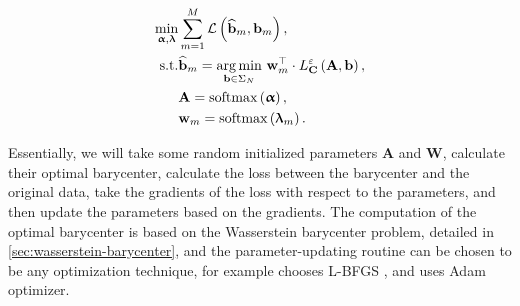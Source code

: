 \begin{equation}\label{eqn:wasserstein-dictionary-problem-unconstrained}
  \begin{aligned}
    \min_{\boldsymbol\upalpha, \boldsymbol\uplambda}
     &
    \sum_{m = 1}^M \mathcal{L} \left(\widehat{\mathbf{b}}_m, \mathbf{b}_m\right),             \\
    \text{s.t.}
     & \widehat{\mathbf{b}}_m =
    \operatorname*{arg\,min}_{\mathbf{b} \in \Sigma_N}\,
    \mathbf{w}_{m}^\top \cdot L_{\mathbf{C}}^\varepsilon \left(\mathbf{A}, \mathbf{b}\right), \\
     & \mathbf{A} = \text{softmax} \left(\boldsymbol\upalpha\right),                          \\
     & \mathbf{w}_m = \text{softmax} \left(\boldsymbol\uplambda_m\right).
  \end{aligned}
\end{equation}


Essentially, we will take some random initialized parameters $\mathbf{A}$ and $\mathbf{W}$,
calculate their optimal barycenter,
calculate the loss between the barycenter and the original data,
take the gradients of the loss with respect to the parameters,
and then update the parameters based on the gradients.
The computation of the optimal barycenter is based on the Wasserstein barycenter problem,
detailed in \cref{sec:wasserstein-barycenter},
and the parameter-updating routine can be chosen to be any optimization technique,
for example \citet{schmitz2018} chooses L-BFGS \citep{liu1989},
and \citet{xie2020} uses Adam \citep{kingma2015} optimizer.




